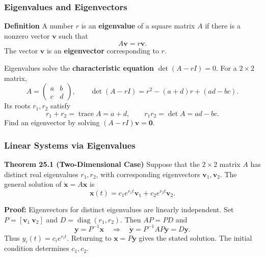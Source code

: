 \documentclass[9pt,aspectratio=169]{beamer}
\begin{document}
\begin{frame}
    \frametitle{Eigenvalues and Eigenvectors}
    \begin{block}{\textbf{Definition}}
        A number $r$ is an \textbf{eigenvalue} of a square matrix $A$ if
        there is a nonzero vector $\mathbf{v}$ such that
        \[
            A\mathbf{v}=r\mathbf{v}.
        \]
        The vector $\mathbf{v}$ is an \textbf{eigenvector} corresponding
        to $r$.
    \end{block}
    Eigenvalues solve the \textbf{characteristic equation}
    $\det(A-rI)=0$. For a $2\times2$ matrix,
    \[
        A=\begin{pmatrix}a&b\\c&d\end{pmatrix},\qquad
        \det(A-rI)=r^2-(a+d)r+(ad-bc).
    \]
    Its roots $r_1,r_2$ satisfy
    \[
        r_1+r_2=\operatorname{trace}A=a+d,\qquad
        r_1r_2=\det A=ad-bc.
    \]
    Find an eigenvector by solving $(A-rI)\mathbf{v}=\mathbf{0}$.
\end{frame}

\begin{frame}
    \frametitle{Linear Systems via Eigenvalues}
    \begin{block}{\textbf{Theorem 25.1 (Two-Dimensional Case)}}
        Suppose that the $2\times2$ matrix $A$ has distinct real
        eigenvalues $r_1,r_2$, with corresponding eigenvectors
        $\mathbf{v}_1,\mathbf{v}_2$. The general solution of
        $\dot{\mathbf{x}}=A\mathbf{x}$ is
        \[
            \mathbf{x}(t)=c_1e^{r_1t}\mathbf{v}_1
                         +c_2e^{r_2t}\mathbf{v}_2.
        \]
    \end{block}
    \textbf{Proof:} Eigenvectors for distinct eigenvalues are linearly
    independent. Set $P=[\mathbf{v}_1\ \mathbf{v}_2]$ and
    $D=\operatorname{diag}(r_1,r_2)$. Then $AP=PD$ and
    \[
        \mathbf{y}=P^{-1}\mathbf{x}\quad\Longrightarrow\quad
        \dot{\mathbf{y}}=P^{-1}AP\mathbf{y}=D\mathbf{y}.
    \]
    Thus $y_i(t)=c_ie^{r_it}$. Returning to $\mathbf{x}=P\mathbf{y}$
    gives the stated solution. The initial condition determines $c_1,c_2$.
\end{frame}
\end{document}
